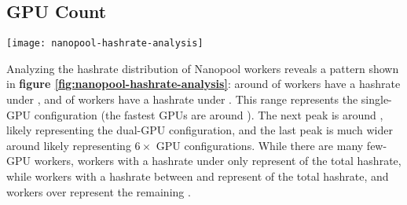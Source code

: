 \begin{appendices}




\section{GPU Count}
\label{appendix:gpu-count}

\begin{figure*}[htp]
    \centering
    \texttt{[image: nanopool-hashrate-analysis]}
    \caption{Analysis of the hashrate distribution of around 70,000 active Nanopool workers per day over 4 days.}
    \label{fig:nanopool-hashrate-analysis}
\end{figure*}

Analyzing the hashrate distribution of Nanopool workers reveals a pattern shown in \textbf{figure \ref{fig:nanopool-hashrate-analysis}}: around  of workers have a hashrate under , and  of workers have a hashrate under . This range represents the single-GPU configuration (the fastest GPUs are around ). The next peak is around , likely representing the dual-GPU configuration, and the last peak is much wider around  likely representing $6\times$ GPU configurations. While there are many few-GPU workers, workers with a hashrate under  only represent  of the total hashrate, while workers with a hashrate between  and  represent  of the total hashrate, and workers over  represent the remaining .


\end{appendices}
